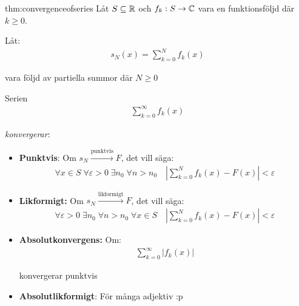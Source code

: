 \begin{theo}{thm:convergenceofseries}
  Låt $S\subseteq\mathbb{R}$ och $f_k:S\to\mathbb{C}$ vara en funktionsföljd där $k\geq0$.
  \par\bigskip
  \noindent Låt:
  \begin{equation*}
    \begin{gathered}
      s_N(x) = \sum_{k=0}^{N}f_k(x)
    \end{gathered}
  \end{equation*}\par
  \noindent vara följd av partiella summor där $N\geq0$
  \par\bigskip
  \noindent Serien
  \begin{equation*}
    \begin{gathered}
      \sum_{k=0}^{\infty}f_k(x)
    \end{gathered}
  \end{equation*}\par
  \noindent \textit{konvergerar}:\par
  \begin{itemize}
    \item\textbf{Punktvis}: Om $s_N\stackrel{\text{punktvis}}{\to}F$, det vill säga:
      \begin{equation*}
        \begin{gathered}
          \forall x\in S\;\forall \varepsilon>0\;\exists n_0\;\forall n>n_0\quad \left|\sum_{k=0}^{N}f_k(x)-F(x)\right|<\varepsilon
        \end{gathered}
      \end{equation*}
      \par\bigskip
    \item\textbf{Likformigt:} Om $s_N\stackrel{\text{likformigt}}{\to}F$, det vill säga:
      \begin{equation*}
        \begin{gathered}
          \forall \varepsilon>0\;\exists n_0\;\forall n>n_0\;\forall x\in S\quad \left|\sum_{k=0}^{N}f_k(x)-F(x)\right|<\varepsilon
        \end{gathered}
      \end{equation*}
      \par\bigskip
    \item\textbf{Absolutkonvergens:} Om:
      \begin{equation*}
        \begin{gathered}
          \sum_{k=0}^{\infty}\left|f_k(x)\right|
        \end{gathered}
      \end{equation*}\par
      \noindent konvergerar punktvis
      \par\bigskip
    \item\textbf{Absolutlikformigt}: För många adjektiv :p
  \end{itemize}
  \par\bigskip
\end{theo}
